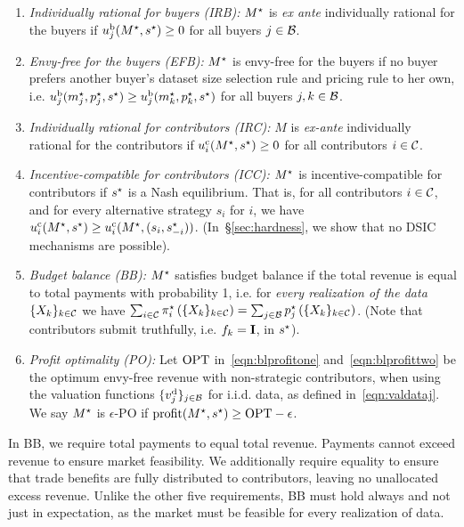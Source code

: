 \begin{enumerate} [leftmargin=0.2in]
\label{mech:requirements}

\item \emph{Individually rational for buyers (IRB):}
$M^\star$ is \emph{ex ante}  individually rational for the buyers if
$u^{\rm b}_{j}(M^\star, s^\star) \geq 0$ for all buyers $j\in\mathcal{B}$.

\item \emph{Envy-free for the buyers (EFB):}
$M^\star$ is envy-free for the buyers if no buyer prefers another buyer's dataset size selection rule and pricing rule to her own, i.e.
  $u^{\rm b}_{j}(m^\star_j, p^\star_j, s^\star) 
    \geq u^{\rm b}_{j}(m^\star_k, p^\star_k, s^\star)$ for all buyers $j,k\in\mathcal{B}$. %
    
\item \emph{Individually rational for contributors (IRC):}
$M$ is \emph{ex-ante} individually rational for the contributors if $u^{\rm c}_{i}(M^\star, s^\star) \geq 0$ for all contributors $i\in\mathcal{C}$.

\item \emph{Incentive-compatible for contributors (ICC):}
$M^\star$ is incentive-compatible for contributors if $s^\star$ is a Nash equilibrium. That is,  for all contributors $i\in\mathcal{C}$, and  for every alternative strategy $s_i$ for  $i$, we have $u^{\rm c}_{i}(M^\star, s^\star) \geq u^{\rm c}_{i}(M^\star, (s_i, s^\star_{-i}))$.
(In~\S\ref{sec:hardness}, we show that no DSIC mechanisms are possible).


\item \emph{Budget balance (BB):}
$M^\star$ satisfies budget balance if the total revenue 
is equal to total payments with probability 1,
i.e. for \emph{every realization of the data}
$\{X_{k}\}_{k\in\mathcal{C}}$ 
we have $\sum_{i\in\mathcal{C}} \pi^\star_i\left(\{X_{k}\}_{k\in\mathcal{C}}\right)
=
\sum_{j\in\mathcal{B}} p^\star_j\left(\{X_{k}\}_{k\in\mathcal{C}}\right)
$. (Note that contributors submit truthfully, i.e. $f_k={\rm \bf I}$, in $s^\star$).

\item \emph{Profit optimality (PO):}
Let ${\rm OPT}$ in~\eqref{eqn:blprofitone} and~\eqref{eqn:blprofittwo} be the optimum
envy-free revenue with non-strategic contributors, when using the valuation functions $\{v^{\rm d}_{j}\}_{j\in\mathcal{B}}$ for i.i.d. data, as defined in~\eqref{eqn:valdataj}.
We say $M^\star$ is $\epsilon$-PO if 
${\rm profit}(M^\star, s^\star) \geq {\rm OPT} - \epsilon$.
    
\end{enumerate}
In BB, we require total payments to equal total revenue. Payments cannot exceed revenue to ensure market feasibility.
We additionally require equality to ensure that trade benefits are fully distributed to contributors, leaving no unallocated excess revenue.
Unlike the other five requirements, BB must hold always and not just in expectation, as the market must be feasible for every realization of data.


